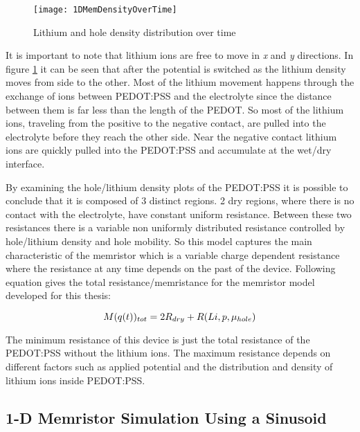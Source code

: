 \begin{doublespace}
\begin{figure}[!htp]
\centering
\texttt{[image: 1DMemDensityOverTime]}
\caption{Lithium and hole density distribution over time} 
\label{MempLi}
\end{figure}

It is important to note that lithium ions are free to move in \textit{x} and \textit{y} directions. In figure \ref{MempLi} it can be seen that after the potential is switched as the lithium density moves from  side to the other. Most of the lithium movement happens through the exchange of ions between PEDOT:PSS and the electrolyte since the distance between them is far less than the length of the PEDOT. So most of the lithium ions, traveling from the positive to the negative contact, are pulled into the electrolyte before they reach the other side. Near the negative contact lithium ions are quickly pulled into the PEDOT:PSS and accumulate at the wet/dry interface. 

By examining the hole/lithium density plots of the PEDOT:PSS it is possible to conclude that it is composed of 3 distinct regions. 2 dry regions, where there is no contact with the electrolyte, have constant uniform resistance. Between these two resistances there is a variable non uniformly distributed resistance controlled by hole/lithium density and hole mobility. So this model captures the main characteristic of the memristor which is a variable charge dependent resistance where the resistance at any time depends on the past of the device. Following equation gives the total resistance/memristance for the memristor model developed for this thesis:

\begin{equation}
\centering
M(q(t))_{tot}=2R_{dry}+R(Li,p,\mu_{hole})
\end{equation}

The minimum resistance of this device is just the total resistance of the PEDOT:PSS without the lithium ions. The maximum resistance depends on different factors such as applied potential and the distribution and density of lithium ions inside PEDOT:PSS.

\clearpage
\subsection{1-D Memristor Simulation Using a Sinusoid}


\end{doublespace}
